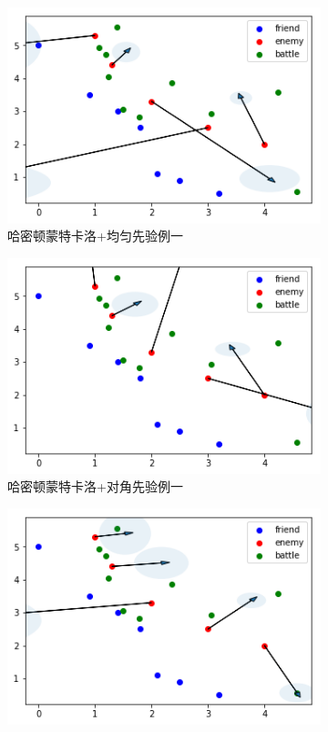 \documentclass{article}
\begin{document}
\begin{figure}[ht]
  \begin{subfigure}[b]{0.45\linewidth}
    \includegraphics[width=\linewidth]{Sampling31.png}
    \caption{哈密顿蒙特卡洛+均匀先验例一}
  \end{subfigure}
  \begin{subfigure}[b]{0.45\linewidth}
    \includegraphics[width=\linewidth]{Sampling32.png}
    \caption{哈密顿蒙特卡洛+对角先验例一}
  \end{subfigure}
  \begin{subfigure}[b]{0.45\linewidth}
    \includegraphics[width=\linewidth]{Sampling41.png}

\end{subfigure}
\end{figure}
\end{document}
